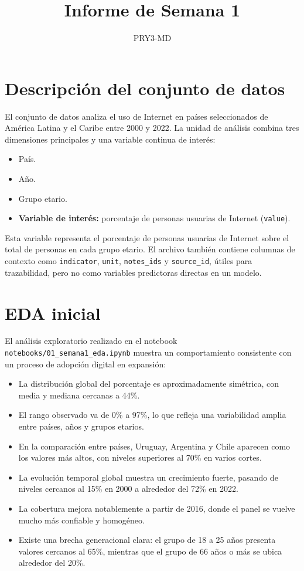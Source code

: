 \documentclass[12pt,a4paper]{article}
\title{Informe de Semana 1}
\author{PRY3-MD}
\date{}
\begin{document}
\maketitle

\section{Descripción del conjunto de datos}

El conjunto de datos analiza el uso de Internet en países seleccionados de América Latina y el Caribe entre 2000 y 2022. La unidad de análisis combina tres dimensiones principales y una variable continua de interés:

\begin{itemize}
    \item País.
    \item Año.
    \item Grupo etario.
    \item \textbf{Variable de interés:} porcentaje de personas usuarias de Internet (\texttt{value}).
\end{itemize}

Esta variable representa el porcentaje de personas usuarias de Internet sobre el total de personas en cada grupo etario. El archivo también contiene columnas de contexto como \texttt{indicator}, \texttt{unit}, \texttt{notes\_ids} y \texttt{source\_id}, útiles para trazabilidad, pero no como variables predictoras directas en un modelo.

\section{EDA inicial}

El análisis exploratorio realizado en el notebook \texttt{notebooks/01\_semana1\_eda.ipynb} muestra un comportamiento consistente con un proceso de adopción digital en expansión:

\begin{itemize}
    \item La distribución global del porcentaje es aproximadamente simétrica, con media y mediana cercanas a 44\%.
    \item El rango observado va de 0\% a 97\%, lo que refleja una variabilidad amplia entre países, años y grupos etarios.
    \item En la comparación entre países, Uruguay, Argentina y Chile aparecen como los valores más altos, con niveles superiores al 70\% en varios cortes.
    \item La evolución temporal global muestra un crecimiento fuerte, pasando de niveles cercanos al 15\% en 2000 a alrededor del 72\% en 2022.
    \item La cobertura mejora notablemente a partir de 2016, donde el panel se vuelve mucho más confiable y homogéneo.
    \item Existe una brecha generacional clara: el grupo de 18 a 25 años presenta valores cercanos al 65\%, mientras que el grupo de 66 años o más se ubica alrededor del 20\%.
\end{itemize}
\end{document}
